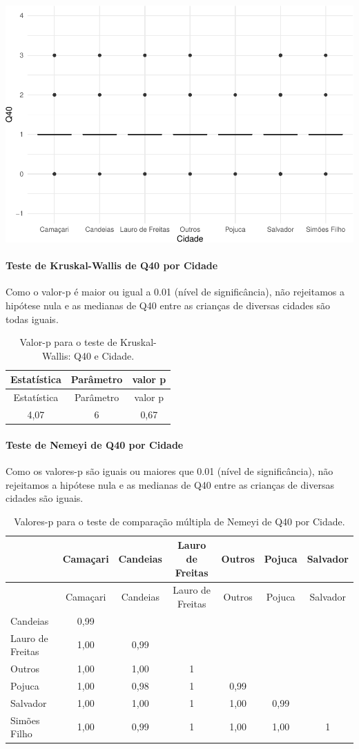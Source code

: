 \documentclass[]{article}
\let\oldparagraph\paragraph
\renewcommand{\paragraph}[1]{\oldparagraph{#1}\mbox{}}
\begin{document}
\begin{center}\includegraphics[width=0.75\linewidth]{relatorio_covid19_files/figure-latex/unnamed-chunk-1552-1} \end{center}

\hypertarget{teste-de-kruskal-wallis-de-q40-por-cidade}{%
\paragraph{Teste de Kruskal-Wallis de Q40 por Cidade}\label{teste-de-kruskal-wallis-de-q40-por-cidade}}

Como o valor-p é maior ou igual a 0.01 (nível de significância), não rejeitamos a hipótese nula e as medianas de Q40 entre as crianças de diversas cidades são todas iguais.

\begin{longtable}[]{@{}ccc@{}}
\caption{\label{tab:unnamed-chunk-1554}Valor-p para o teste de Kruskal-Wallis: Q40 e Cidade.}\tabularnewline
\toprule
Estatística & Parâmetro & valor p\tabularnewline
\midrule
\endfirsthead
\toprule
Estatística & Parâmetro & valor p\tabularnewline
\midrule
\endhead
4,07 & 6 & 0,67\tabularnewline
\bottomrule
\end{longtable}

\hypertarget{teste-de-nemeyi-de-q40-por-cidade}{%
\paragraph{Teste de Nemeyi de Q40 por Cidade}\label{teste-de-nemeyi-de-q40-por-cidade}}

Como os valores-p são iguais ou maiores que 0.01 (nível de significância), não rejeitamos a hipótese nula e as medianas de Q40 entre as crianças de diversas cidades são iguais.

\begin{longtable}[]{@{}lcccccc@{}}
\caption{\label{tab:unnamed-chunk-1556}Valores-p para o teste de comparação múltipla de Nemeyi de Q40 por Cidade.}\tabularnewline
\toprule
& Camaçari & Candeias & Lauro de Freitas & Outros & Pojuca & Salvador\tabularnewline
\midrule
\endfirsthead
\toprule
& Camaçari & Candeias & Lauro de Freitas & Outros & Pojuca & Salvador\tabularnewline
\midrule
\endhead
Candeias & 0,99 & & & & &\tabularnewline
Lauro de Freitas & 1,00 & 0,99 & & & &\tabularnewline
Outros & 1,00 & 1,00 & 1 & & &\tabularnewline
Pojuca & 1,00 & 0,98 & 1 & 0,99 & &\tabularnewline
Salvador & 1,00 & 1,00 & 1 & 1,00 & 0,99 &\tabularnewline
Simões Filho & 1,00 & 0,99 & 1 & 1,00 & 1,00 & 1\tabularnewline
\bottomrule
\end{longtable}
\end{document}
